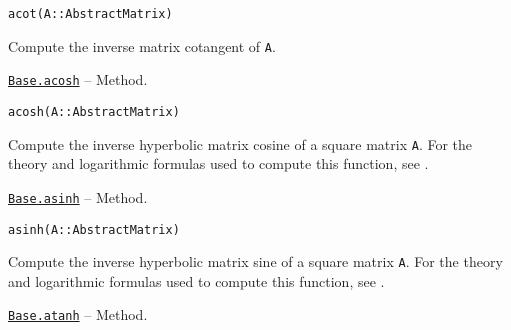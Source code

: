 \begin{adjustwidth}{2em}{0pt}


\begin{verbatim}
acot(A::AbstractMatrix)
\end{verbatim}

Compute the inverse matrix cotangent of \texttt{A}. 



\end{adjustwidth}
\hypertarget{8148684206205068128}{} 
\hyperlink{8148684206205068128}{\texttt{Base.acosh}}  -- {Method.}

\begin{adjustwidth}{2em}{0pt}


\begin{verbatim}
acosh(A::AbstractMatrix)
\end{verbatim}

Compute the inverse hyperbolic matrix cosine of a square matrix \texttt{A}.  For the theory and logarithmic formulas used to compute this function, see \footnotemark[15].



\end{adjustwidth}
\hypertarget{7556135416358066324}{} 
\hyperlink{7556135416358066324}{\texttt{Base.asinh}}  -- {Method.}

\begin{adjustwidth}{2em}{0pt}


\begin{verbatim}
asinh(A::AbstractMatrix)
\end{verbatim}

Compute the inverse hyperbolic matrix sine of a square matrix \texttt{A}.  For the theory and logarithmic formulas used to compute this function, see \footnotemark[16].



\end{adjustwidth}
\hypertarget{631136805929918109}{} 
\hyperlink{631136805929918109}{\texttt{Base.atanh}}  -- {Method.}

